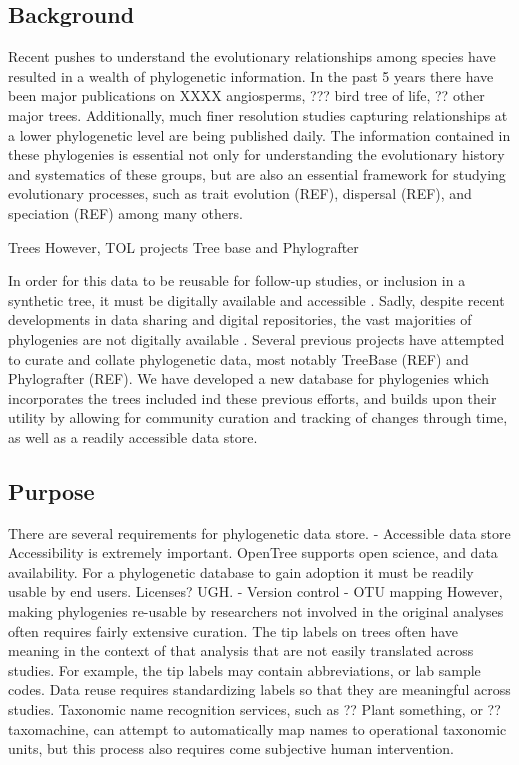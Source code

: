 \documentclass[a4paper,10pt]{article}
\begin{document}
 
\subsection{Background}
Recent pushes to understand the evolutionary relationships among species have resulted in a wealth of phylogenetic information. 
In the past 5 years there have been major publications on XXXX angiosperms, ??? bird tree of life, ?? other major trees.
Additionally, much finer resolution studies capturing relationships at a lower phylogenetic level are being published daily.
The information contained in these phylogenies is essential not only for understanding the evolutionary history and systematics of these groups,
but are also an essential framework for studying evolutionary processes, such as trait evolution (REF), dispersal (REF), and speciation (REF)
among many others.

Trees 
     However,
     TOL projects
     Tree base and Phylografter

In order for this data to be reusable for follow-up studies, or inclusion in a synthetic tree, it must be digitally available and accessible \cite{cranston_best_2014}.
Sadly, despite recent developments in data sharing and digital repositories, the vast majorities of phylogenies are not digitally available \cite{Drew}.
Several previous projects have attempted to curate and collate phylogenetic data, most notably TreeBase (REF) and Phylografter (REF).
We have developed a new database for phylogenies which incorporates the trees included ind these previous efforts, 
and builds upon their utility by allowing for community curation and tracking of changes through time, as well as a readily accessible data store.

\subsection{Purpose}
There are several requirements for phylogenetic data store.
      - Accessible data store
Accessibility is extremely important.
OpenTree supports open science, and data availability.
For a phylogenetic database to gain adoption it must be readily usable by end users.
Licenses? UGH.
          - Version control
          - OTU mapping
However, making phylogenies re-usable by researchers not involved in the original analyses often requires fairly extensive curation.
The tip labels on trees often have meaning in the context of that analysis that are not easily translated across studies. 
For example, the tip labels may contain abbreviations, or lab sample codes.
Data reuse requires standardizing labels so that they are meaningful across studies.
Taxonomic name recognition services, such as ?? Plant something, or ?? taxomachine, can attempt to automatically map names to
operational taxonomic units, but this process also requires come subjective human intervention. 
\end{document}
